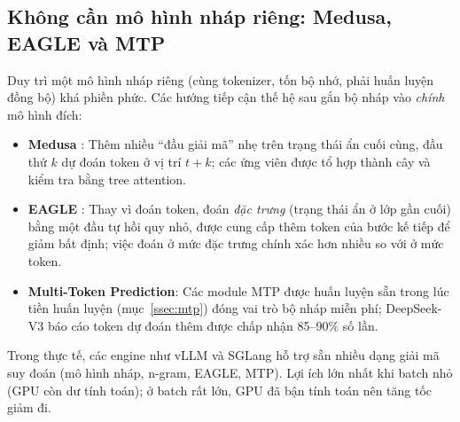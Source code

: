 \subsection{Không cần mô hình nháp riêng: Medusa, EAGLE và MTP}
\label{ssec:draft_free}
Duy trì một mô hình nháp riêng (cùng tokenizer, tốn bộ nhớ, phải huấn luyện đồng bộ) khá phiền phức. Các hướng tiếp cận thế hệ sau gắn bộ nháp vào \emph{chính} mô hình đích:
\begin{itemize}
	\item \textbf{Medusa} \cite{cai2024medusa}: Thêm nhiều “đầu giải mã” nhẹ trên trạng thái ẩn cuối cùng, đầu thứ $k$ dự đoán token ở vị trí $t+k$; các ứng viên được tổ hợp thành cây và kiểm tra bằng tree attention.
	\item \textbf{EAGLE} \cite{li2024eagle}: Thay vì đoán token, đoán \emph{đặc trưng} (trạng thái ẩn ở lớp gần cuối) bằng một đầu tự hồi quy nhỏ, được cung cấp thêm token của bước kế tiếp để giảm bất định; việc đoán ở mức đặc trưng chính xác hơn nhiều so với ở mức token.
	\item \textbf{Multi-Token Prediction}: Các module MTP được huấn luyện sẵn trong lúc tiền huấn luyện (mục~\ref{ssec:mtp}) đóng vai trò bộ nháp miễn phí; DeepSeek-V3 báo cáo token dự đoán thêm được chấp nhận 85--90\% số lần.
\end{itemize}
Trong thực tế, các engine như vLLM và SGLang hỗ trợ sẵn nhiều dạng giải mã suy đoán (mô hình nháp, n-gram, EAGLE, MTP). Lợi ích lớn nhất khi batch nhỏ (GPU còn dư tính toán); ở batch rất lớn, GPU đã bận tính toán nên tăng tốc giảm đi.
